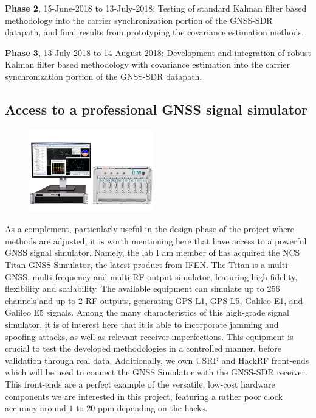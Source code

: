 \textbf{Phase 2}, 15-June-2018 to 13-July-2018: Testing of standard Kalman filter based methodology into the carrier synchronization portion of the GNSS-SDR datapath, and final results from prototyping the covariance estimation methods.

\textbf{Phase 3}, 13-July-2018 to 14-August-2018: Development and integration of robust Kalman filter based methodology with covariance estimation into the carrier synchronization portion of the GNSS-SDR datapath.





\subsection{Access to a professional GNSS signal simulator}\label{sec:intro:approach:synthdata}

\begin{figure}
\centering
\includegraphics[width=0.48\textwidth]{fig/NCS-Titan_GNSS_Simulator.png}
\end{figure}
As a complement, particularly useful in the design phase of the project where methods are adjusted, it is worth mentioning here that have access to a powerful GNSS signal simulator. Namely, the lab I am member of has acquired the NCS Titan GNSS Simulator, the latest product from IFEN. The Titan is a multi-GNSS, multi-frequency and multi-RF output simulator, featuring high fidelity, flexibility and scalability. The available equipment can simulate up to 256 channels and up to 2 RF outputs, generating GPS L1, GPS L5, Galileo E1, and Galileo E5 signals. Among the many characteristics of this high-grade signal simulator, it is of interest here that it is able to incorporate jamming and spoofing attacks, as well as relevant receiver imperfections. This equipment is crucial to test the developed methodologies in a controlled manner, before validation through real data. Additionally, we own USRP and HackRF front-ends which will be used to connect the GNSS Simulator with the GNSS-SDR receiver. This front-ends are a perfect example of the versatile, low-cost hardware components we are interested in this project, featuring a rather poor clock accuracy around $1$ to $20$ ppm depending on the hacks.